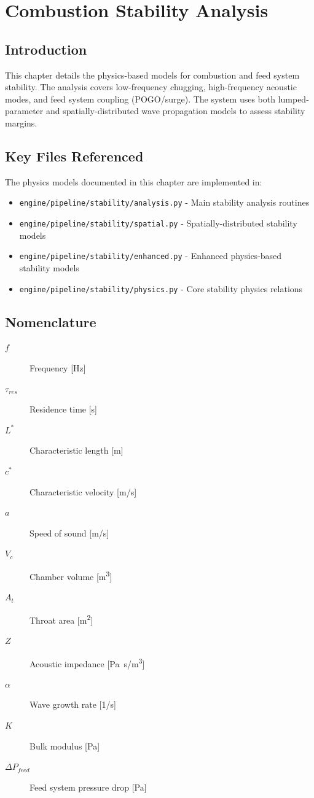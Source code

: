 \section{Combustion Stability Analysis}

\subsection{Introduction}
This chapter details the physics-based models for combustion and feed system stability. The analysis covers low-frequency chugging, high-frequency acoustic modes, and feed system coupling (POGO/surge). The system uses both lumped-parameter and spatially-distributed wave propagation models to assess stability margins.

\subsection{Key Files Referenced}
The physics models documented in this chapter are implemented in:
\begin{itemize}
    \item \texttt{engine/pipeline/stability/analysis.py} - Main stability analysis routines
    \item \texttt{engine/pipeline/stability/spatial.py} - Spatially-distributed stability models
    \item \texttt{engine/pipeline/stability/enhanced.py} - Enhanced physics-based stability models
    \item \texttt{engine/pipeline/stability/physics.py} - Core stability physics relations
\end{itemize}

\subsection{Nomenclature}
\begin{description}
    \item[$f$] Frequency [\si{Hz}]
    \item[$\tau_{res}$] Residence time [\si{s}]
    \item[$L^*$] Characteristic length [\si{m}]
    \item[$c^*$] Characteristic velocity [\si{m/s}]
    \item[$a$] Speed of sound [\si{m/s}]
    \item[$V_c$] Chamber volume [\si{m^3}]
    \item[$A_t$] Throat area [\si{m^2}]
    \item[$Z$] Acoustic impedance [\si{Pa.s/m^3}]
    \item[$\alpha$] Wave growth rate [\si{1/s}]
    \item[$K$] Bulk modulus [\si{Pa}]
    \item[$\Delta P_{feed}$] Feed system pressure drop [\si{Pa}]
\end{description}

